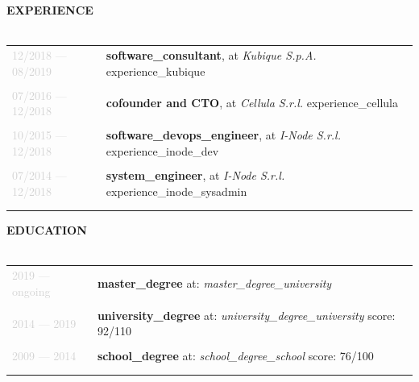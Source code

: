 \documentclass{article}
\begin{document}
\textbf{\textcolor{deepblue}{\uppercase{{{experience}}}}} \\\\ \hfill
\begin{tabular}{ R{3cm} L{12cm} }
	\textcolor{lightgray}{12/2018 — 08/2019} &
		\textbf{{{software_consultant}}}, \MakeLowercase{{{at}}} \textit{Kubique S.p.A.} \linebreak
		{{experience_kubique}} \\\\ \hfill
	\textcolor{lightgray}{07/2016 — 12/2018} &
		\textbf{{{cofounder}} {{and}} CTO}, \MakeLowercase{{{at}}} \textit{Cellula S.r.l.} \linebreak
		{{experience_cellula}} \\\\ \hfill
	\textcolor{lightgray}{10/2015 — 12/2018} &
		\textbf{{{software_devops_engineer}}}, \MakeLowercase{{{at}}} \textit{I-Node S.r.l.} \linebreak
		{{experience_inode_dev}} \\\\ \hfill
	\textcolor{lightgray}{07/2014 — 12/2018} &
		\textbf{{{system_engineer}}}, \MakeLowercase{{{at}}} \textit{I-Node S.r.l.} \linebreak
		{{experience_inode_sysadmin}} \\\\ \hfill
\end{tabular}

\textbf{\textcolor{deepblue}{\uppercase{{{education}}}}} \\\\ \hfill
\begin{tabular}{ R{3cm} L{12cm} }
	\textcolor{lightgray}{2019 — {{ongoing}}} &
		\textbf{{{master_degree}}} \linebreak
		{{at}}: \textit{{{master_degree_university}}} \\\\ \hfill
	\textcolor{lightgray}{2014 — 2019} &
		\textbf{{{university_degree}}} \linebreak
		{{at}}: \textit{{{university_degree_university}}} \linebreak
		{{score}}: 92/110 \\\\ \hfill
	\textcolor{lightgray}{2009 — 2014} &
		\textbf{{{school_degree}}} \linebreak
		{{at}}: \textit{{{school_degree_school}}} \linebreak
		{{score}}: 76/100 \\\\ \hfill
\end{tabular}
\end{document}
